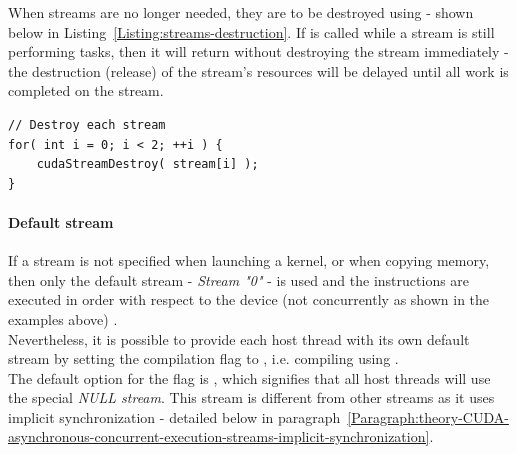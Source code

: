 When streams are no longer needed, they are to be destroyed using  - shown below in Listing~\ref{Listing:streams-destruction}. If  is called while a stream is still performing tasks, then it will return without destroying the stream immediately - the destruction (release) of the stream's resources will be delayed until all work is completed on the stream.

\begin{lstlisting}[caption={Destruction of streams. Taken from Nvidia's \emph{CUDA C++ Programming Guide} \cite{NVIDIAMay2022}.},label={Listing:streams-destruction}]
// Destroy each stream
for( int i = 0; i < 2; ++i ) {
	cudaStreamDestroy( stream[i] );
}
\end{lstlisting}

\paragraph{Default stream}\label{Paragraph:theory-CUDA-asynchronous-concurrent-execution-streams-default-stream}
If a stream is not specified when launching a kernel, or when copying memory, then only the default stream - \textit{Stream "0"} - is used and the instructions are executed in order with respect to the device (not concurrently as shown in the examples above) \cite{NVIDIAMay2022}. \\
Nevertheless, it is possible to provide each host thread with its own default stream by setting the  compilation flag to , i.e. compiling using . \\
The default option for the flag is , which signifies that all host threads will use the special \textit{NULL stream}. This stream is different from other streams as it uses implicit synchronization - detailed below in paragraph~\ref{Paragraph:theory-CUDA-asynchronous-concurrent-execution-streams-implicit-synchronization}.

